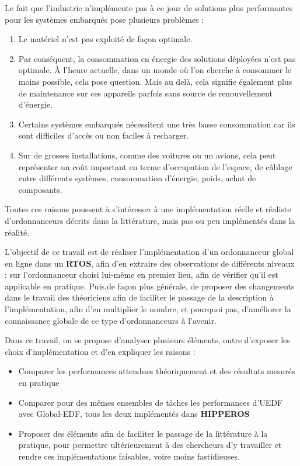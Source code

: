 	Le fait que l'industrie n'implémente pas à ce jour de solutions plus \og performantes \fg{} 
	pour les systèmes embarqués pose plusieurs problèmes :
	\begin{enumerate}
		\item Le matériel n'est pas exploité de façon optimale.
		\item Par conséquent, la consommation en énergie des solutions déployées n'est 
		pas optimale.
		À l'heure actuelle, dans un monde où l'on cherche à consommer le moins possible, 
		cela pose question. Mais au delà, cela signifie également plus de maintenance 
		sur ces appareils parfois sans source de renouvellement d'énergie.
		\item Certains systèmes embarqués nécessitent une très basse consommation car 
		ils sont difficiles d'accès ou non faciles à recharger.
		\item Sur de grosses installations, comme des voitures ou un avions, cela peut représenter 
		un coût important en terme d'occupation de l'espace, de câblage entre différents systèmes, 
		consommation d'énergie, poids, achat de composants.
	\end{enumerate}
	
	Toutes ces raisons poussent à s'intéresser à une implémentation réelle et réaliste 
	d'ordonnanceurs décrits dans la littérature, mais pas ou peu implémentés dans la réalité. \newline
	
	L'objectif de ce travail est de réaliser l'implémentation d'un ordonnanceur global en ligne 
	dans un \textbf{RTOS}, afin d'en extraire des observations de différents niveaux :
	sur l'ordonnanceur choisi lui-même en premier lieu, afin de vérifier qu'il est applicable en pratique.
	Puis,de façon plus générale, de proposer des changements dans le travail des théoriciens afin de faciliter le passage 
	de la description à l'implémentation, afin d'en multiplier le nombre, et pourquoi pas, d'améliorer la connaissance globale 
	de ce type d'ordonnanceurs à l'avenir.\newline
		
	Dans ce travail, on se propose d’analyser plusieurs éléments, outre d’exposer les choix d’implémentation et d’en expliquer les raisons : \medskip
	\begin{itemize}
		\item Comparer les performances attendues théoriquement et des résultats mesurés en pratique
		\item Comparer pour des mêmes ensembles de tâches les performances d’UEDF avec Global-EDF, tous les deux implémentés
		dans \textbf{HIPPEROS}
		\item Proposer des éléments afin de faciliter le passage de la littérature à la pratique, pour permettre
		ultérieurement à des chercheurs d'y travailler et rendre ces implémentations 
		faisables, voire moins fastidieuses.
	\end{itemize}
	
	